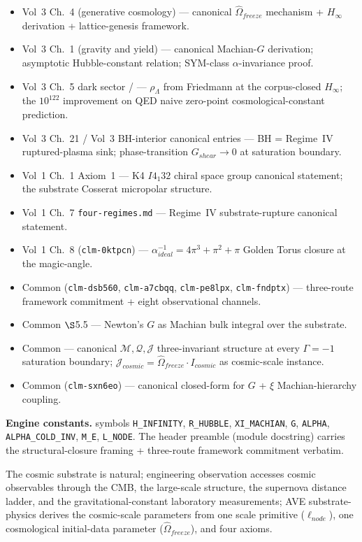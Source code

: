 \begin{itemize}
    \item Vol~3 Ch.~4 (generative cosmology) --- canonical $\hat{\Omega}_{freeze}$ mechanism + $H_\infty$ derivation + lattice-genesis framework.
    \item Vol~3 Ch.~1 (gravity and yield) --- canonical Machian-$G$ derivation; asymptotic Hubble-constant relation; SYM-class $\alpha$-invariance proof.
    \item Vol~3 Ch.~5 dark sector /  --- $\rho_\Lambda$ from Friedmann at the corpus-closed $H_\infty$; the $10^{122}$ improvement on QED naive zero-point cosmological-constant prediction.
    \item Vol~3 Ch.~21 / Vol~3 BH-interior canonical entries --- BH = Regime~IV ruptured-plasma sink; phase-transition $G_{shear} \to 0$ at saturation boundary.
    \item Vol~1 Ch.~1 Axiom~1 --- K4 $I4_1 32$ chiral space group canonical statement; the substrate Cosserat micropolar structure.
    \item Vol~1 Ch.~7 \texttt{four-regimes.md} --- Regime~IV substrate-rupture canonical statement.
    \item Vol~1 Ch.~8  (\texttt{clm-0ktpcn}) --- $\alpha^{-1}_{ideal} = 4\pi^3 + \pi^2 + \pi$ Golden Torus closure at the magic-angle.
    \item Common  (\texttt{clm-dsb560}, \texttt{clm-a7cbqq}, \texttt{clm-pe8lpx}, \texttt{clm-fndptx}) --- three-route framework commitment + eight observational channels.
    \item Common  $\S$5.5 --- Newton's $G$ as Machian bulk integral over the substrate.
    \item Common  --- canonical $\mathcal{M}, \mathcal{Q}, \mathcal{J}$ three-invariant structure at every $\Gamma = -1$\gammaundeclared{} saturation boundary; $\mathcal{J}_{cosmic} = \hat{\Omega}_{freeze} \cdot I_{cosmic}$ as cosmic-scale instance.
    \item Common  (\texttt{clm-sxn6eo}) --- canonical closed-form for $G$ + $\xi$ Machian-hierarchy coupling.
\end{itemize}

\vspace{0.5em}

\noindent
\textbf{Engine constants.}  symbols \texttt{H\_INFINITY}, \texttt{R\_HUBBLE}, \texttt{XI\_MACHIAN}, \texttt{G}, \texttt{ALPHA}, \texttt{ALPHA\_COLD\_INV}, \texttt{M\_E}, \texttt{L\_NODE}. The header preamble (module docstring) carries the structural-closure framing + three-route framework commitment verbatim.

\noindent
The cosmic substrate is natural; engineering observation accesses cosmic observables through the CMB, the large-scale structure, the supernova distance ladder, and the gravitational-constant laboratory measurements; AVE substrate-physics derives the cosmic-scale parameters from one scale primitive ($\ell_{node}$), one cosmological initial-data parameter ($\hat{\Omega}_{freeze}$), and four axioms.
